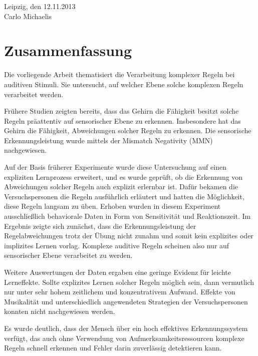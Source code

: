 \documentclass[doc,a4paper,12pt]{apa6}
\begin{document}
\vspace{3em}
\noindent Leipzig, den 12.11.2013\\ Carlo Michaelis

\newpage

\section*{Zusammenfassung}

Die vorliegende Arbeit thematisiert die Verarbeitung komplexer Regeln bei auditiven Stimuli. Sie untersucht, auf welcher Ebene solche komplexen Regeln verarbeitet werden.

Frühere Studien zeigten bereits, dass das Gehirn die Fähigkeit besitzt solche Regeln präattentiv auf sensorischer Ebene zu erkennen. Insbesondere hat das Gehirn die Fähigkeit, Abweichungen solcher Regeln zu erkennen. Die sensorische Erkennungsleistung wurde mittels der Mismatch Negativity (MMN) nachgewiesen.

Auf der Basis früherer Experimente wurde diese Untersuchung auf einen expliziten Lernprozess erweitert, und es wurde geprüft, ob die Erkennung von Abweichungen solcher Regeln auch explizit erlernbar ist. Dafür bekamen die Versuchspersonen die Regeln ausführlich erläutert und hatten die Möglichkeit, diese Regeln langsam zu üben. Erhoben wurden in diesem Experiment ausschließlich behaviorale Daten in Form von Sensitivität und Reaktionszeit. Im Ergebnis zeigte sich zunächst, dass die Erkennungsleistung der Regelabweichungen trotz der Übung nicht zunahm und somit kein explizites oder implizites Lernen vorlag. Komplexe auditive Regeln scheinen also nur auf sensorischer Ebene verarbeitet zu werden.

Weitere Auswertungen der Daten ergaben eine geringe Evidenz für leichte Lerneffekte. Sollte explizites Lernen solcher Regeln möglich sein, dann vermutlich nur unter sehr hohem zeitlichem und konzentrativem Aufwand. Effekte von Musikalität und unterschiedlich angewendeten Strategien der Versuchspersonen konnten nicht nachgewiesen werden.

Es wurde deutlich, dass der Mensch über ein hoch effektives Erkennungssystem verfügt, das auch ohne Verwendung von Aufmerksamkeitsressourcen komplexe Regeln schnell erkennen und Fehler darin zuverlässig detektieren kann.

\newpage

\setcounter{tocdepth}{2}
\tableofcontents
\newpage

\listoffigures
\newpage
\end{document}
